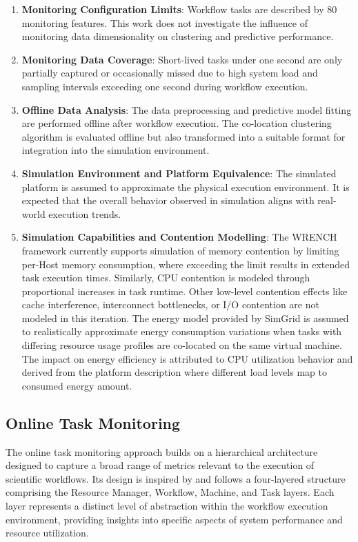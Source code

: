 \begin{enumerate}
    \item \textbf{Monitoring Configuration Limits}:  Workflow tasks are described by 80 monitoring features. This work does not investigate the influence of monitoring data dimensionality on clustering and predictive performance.
    \item \textbf{Monitoring Data Coverage}: Short-lived tasks under one second are only partially captured or occasionally missed due to high system load and sampling intervals exceeding one second during workflow execution.
    \item \textbf{Offline Data Analysis}: The data preprocessing and predictive model fitting are performed offline after workflow execution. The co-location clustering algorithm is evaluated offline but also transformed into a suitable format for integration into the simulation environment.
    \item \textbf{Simulation Environment and Platform Equivalence}: The simulated platform is assumed to approximate the physical execution environment. It is expected that the overall behavior observed in simulation aligns with real-world execution trends.
    \item \textbf{Simulation Capabilities and Contention Modelling}: The WRENCH framework currently supports simulation of memory contention by limiting per-Host memory consumption, where exceeding the limit results in extended task execution times. Similarly, CPU contention is modeled through proportional increases in task runtime. Other low-level contention effects like cache interference, interconnect bottlenecks, or I/O contention are not modeled in this iteration. The energy model provided by SimGrid is assumed to realistically approximate energy consumption variations when tasks with differing resource usage profiles are co-located on the same virtual machine. The impact on energy efficiency is attributed to CPU utilization behavior and derived from the platform description where different load levels map to consumed energy amount.
\end{enumerate}

\subsection{Online Task Monitoring}
\label{sec:online_task_monitoring}

The online task monitoring approach builds on a hierarchical architecture designed to capture a broad range of metrics relevant to the execution of scientific workflows. Its design is inspired by \cite{Bader_2022} and follows a four-layered structure comprising the Resource Manager, Workflow, Machine, and Task layers. Each layer represents a distinct level of abstraction within the workflow execution environment, providing insights into specific aspects of system performance and resource utilization.

